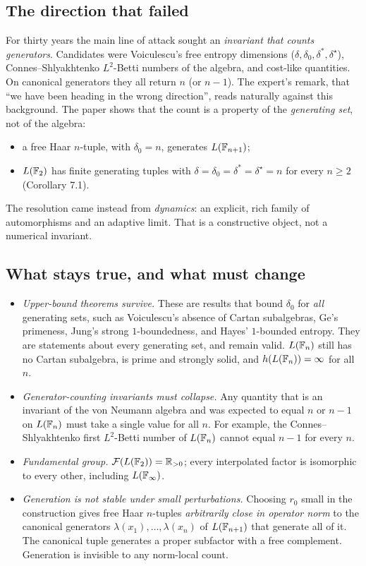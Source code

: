 \label{sec:history}
\subsection{The direction that failed}
For thirty years the main line of attack sought an \emph{invariant that counts generators}. Candidates were Voiculescu's free entropy
dimensions ($\delta,\delta_0,\delta^*,\delta^\star$), Connes--Shlyakhtenko $L^2$-Betti numbers of the algebra, and cost-like quantities. On canonical generators they
all return $n$ (or $n-1$). The expert's remark, that ``we have been heading in the wrong direction'', reads naturally against this background. The paper
shows that the count is a property of the \emph{generating set}, not of the algebra:
\begin{itemize}[leftmargin=*]
\item a free Haar $n$-tuple, with $\delta_0=n$, generates $L(\mathbb F_{n+1})$;
\item $L(\mathbb F_2)$ has finite generating tuples with $\delta=\delta_0=\delta^*=\delta^\star=n$ for every $n\ge2$ (Corollary 7.1).
\end{itemize}
The resolution came instead from \emph{dynamics}: an explicit, rich family of automorphisms and an adaptive limit. That is a constructive object, not a
numerical invariant.

\subsection{What stays true, and what must change}
\begin{itemize}[leftmargin=*]
\item \emph{Upper-bound theorems survive.} These are results that bound $\delta_0$ for \emph{all} generating sets, such as Voiculescu's absence of Cartan
subalgebras, Ge's primeness, Jung's strong $1$-boundedness, and Hayes' $1$-bounded entropy. They are statements about every generating set, and remain
valid. $L(\mathbb F_n)$ still has no Cartan subalgebra, is prime and strongly solid, and $h(L(\mathbb F_n))=\infty$ for all $n$.
\item \emph{Generator-counting invariants must collapse.} Any quantity that is an invariant of the von Neumann algebra and was expected to equal
$n$ or $n-1$ on $L(\mathbb F_n)$ must take a single value for all $n$. For example, the Connes--Shlyakhtenko first $L^2$-Betti number of $L(\mathbb F_n)$ cannot
equal $n-1$ for every $n$.
\item \emph{Fundamental group.} $\mathcal F(L(\mathbb F_2))=\mathbb R_{>0}$; every interpolated factor is isomorphic to every other, including $L(\mathbb F_\infty)$.
\item \emph{Generation is not stable under small perturbations.} Choosing $r_0$ small in the construction gives free Haar $n$-tuples \emph{arbitrarily close in
operator norm} to the canonical generators $\lambda(x_1),\dots,\lambda(x_n)$ of $L(\mathbb F_{n+1})$ that generate all of it. The canonical tuple generates a proper
subfactor with a free complement. Generation is invisible to any norm-local count.
\end{itemize}

